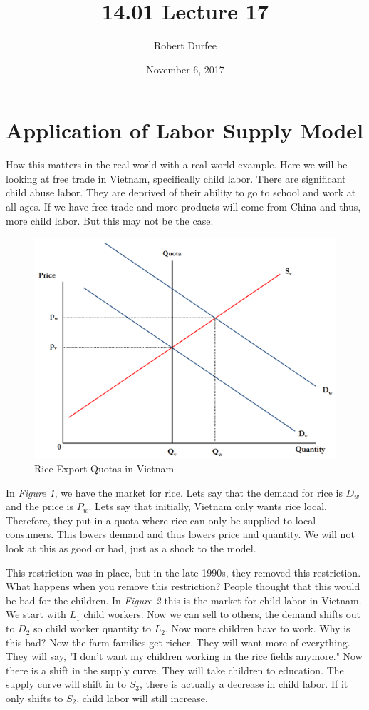 \documentclass{article}
\title{14.01 Lecture 17}
\author{Robert Durfee}
\date{November 6, 2017}
\begin{document}
\maketitle

\section{Application of Labor Supply Model}

How this matters in the real world with a real world example. Here we will be
looking at free trade in Vietnam, specifically child labor. There are
significant child abuse labor. They are deprived of their ability to go to
school and work at all ages. If we have free trade and more products will come
from China and thus, more child labor. But this may not be the case.

\begin{figure}[H]
    \centering
    \includegraphics[scale=0.33]{"Figure 1"}
    \caption{Rice Export Quotas in Vietnam}
\end{figure}

In \textit{Figure 1}, we have the market for rice. Lets say that the demand for
rice is $D_{w}$ and the price is $P_{w}$. Lets say that initially, Vietnam only
wants rice local. Therefore, they put in a quota where rice can only be supplied
to local consumers. This lowers demand and thus lowers price and quantity. We
will not look at this as good or bad, just as a shock to the model. 

This restriction was in place, but in the late 1990s, they removed this
restriction. What happens when you remove this restriction? People thought that
this would be bad for the children. In \textit{Figure 2} this is the market for
child labor in Vietnam. We start with $L_{1}$ child workers. Now we can sell to
others, the demand shifts out to $D_{2}$ so child worker quantity to $L_{2}$.
Now more children have to work. Why is this bad? Now the farm families get
richer. They will want more of everything. They will say, "I don't want my
children working in the rice fields anymore." Now there is a shift in the supply
curve. They will take children to education. The supply curve will shift in to
$S_{3}$, there is actually a decrease in child labor. If it only shifts to
$S_{2}$, child labor will still increase.
\end{document}
